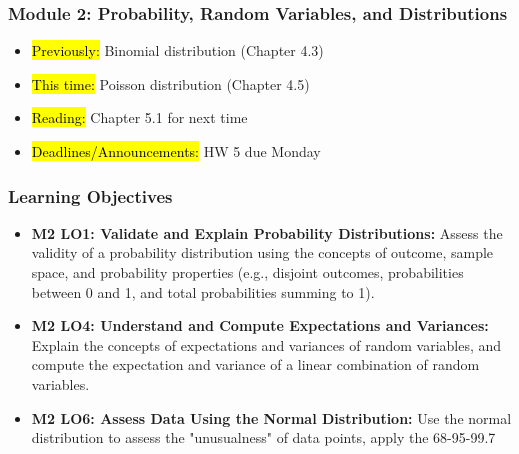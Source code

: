 
\begin{frame}
    \frametitle{Module 2: Probability, Random Variables, and Distributions}
    \begin{itemize}
        \item \hl{Previously: } Binomial distribution (Chapter 4.3)
        \item \hl{This time: } Poisson distribution (Chapter 4.5)
        \item \hl{Reading: } Chapter 5.1 for next time
        \item \hl{Deadlines/Announcements: } HW 5 due Monday
    \end{itemize}
    
\end{frame}
   
\begin{frame}
    \frametitle{Learning Objectives}
    \begin{itemize}
        \item \textbf{M2 LO1: Validate and Explain Probability Distributions:} Assess the validity of a probability distribution using the concepts of outcome, sample space, and probability properties (e.g., disjoint outcomes, probabilities between 0 and 1, and total probabilities summing to 1).
        \item \textbf{M2 LO4: Understand and Compute Expectations and Variances:} Explain the concepts of expectations and variances of random variables, and compute the expectation and variance of a linear combination of random variables.
        \item \textbf{M2 LO6: Assess Data Using the Normal Distribution:} Use the normal distribution to assess the "unusualness" of data points, apply the 68-95-99.7%
    \end{itemize}
\end{frame}
